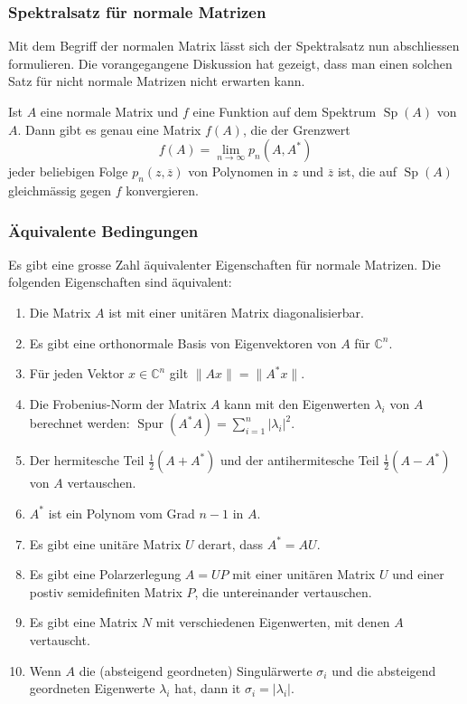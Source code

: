 \subsubsection{Spektralsatz für normale Matrizen}
Mit dem Begriff der normalen Matrix lässt sich der Spektralsatz nun
abschliessen formulieren.
Die vorangegangene Diskussion hat gezeigt, dass man einen solchen
Satz für nicht normale Matrizen nicht erwarten kann.

\begin{satz}
\label{buch:eigenwerte:satz:spektralnormal}
Ist $A$ eine normale Matrix und $f$ eine Funktion auf dem Spektrum
$\operatorname{Sp}(A)$ von $A$.
Dann gibt es genau eine Matrix $f(A)$, die der Grenzwert
\[
f(A)
=
\lim_{n\to\infty} p_n(A,A^*)
\]
jeder beliebigen
Folge $p_n(z,\overline{z})$ von Polynomen in $z$ und $\overline{z}$ ist,
die auf $\operatorname{Sp}(A)$ gleichmässig gegen $f$ konvergieren.
\end{satz}

\subsubsection{Äquivalente Bedingungen}
Es gibt eine grosse Zahl äquivalenter Eigenschaften für normale Matrizen.
Die folgenden Eigenschaften sind äquivalent:
\begin{enumerate}
\item
Die Matrix $A$ ist mit einer unitären Matrix diagonalisierbar.
\item
Es gibt eine orthonormale Basis von Eigenvektoren von $A$ für $\mathbb{C}^n$.
\item
Für jeden Vektor $x\in\mathbb{C}^n$ gilt $\|Ax\|=\|A^*x\|$.
\item
Die Frobenius-Norm der Matrix $A$ kann mit den Eigenwerten $\lambda_i$
%
von $A$ berechnet werden:
$\operatorname{Spur}(A^*A) = \sum_{i=1}^n |\lambda_i|^2$.
\item
Der hermitesche Teil $\frac12(A+A^*)$ und der antihermitesche Teil
$\frac12(A-A^*)$ von $A$ vertauschen.
%
%
\item
$A^*$ ist ein Polynom vom Grad $n-1$ in $A$.
\item
Es gibt eine unitäre Matrix $U$ derart, dass $A^*=AU$.
%
\item
Es gibt eine Polarzerlegung $A=UP$ mit einer unitären Matrix $U$ und
einer postiv semidefiniten Matrix $P$, die untereinander vertauschen.
\item
Es gibt eine Matrix $N$ mit verschiedenen Eigenwerten, mit denen $A$
vertauscht.
\item
Wenn $A$ die (absteigend geordneten) Singulärwerte $\sigma_i$ und
%
die absteigend geordneten Eigenwerte $\lambda_i$ hat,
dann it $\sigma_i=|\lambda_i|$.
\end{enumerate}




